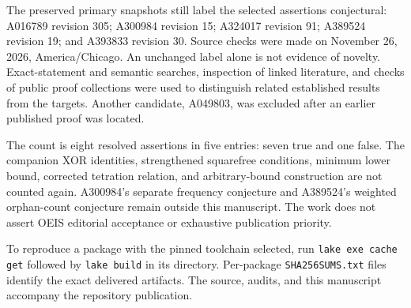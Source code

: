 \documentclass[11pt]{article}
\begin{document}
The preserved primary snapshots still label the selected assertions
conjectural: A016789 revision 305; A300984 revision 15; A324017 revision
91; A389524 revision 19; and A393833 revision 30. Source checks were made
on November 26, 2026, America/Chicago. An unchanged label alone is not
evidence of novelty. Exact-statement and semantic searches, inspection
of linked literature, and checks of public proof collections were used
to distinguish related established results from the targets. Another
candidate, A049803, was excluded after an earlier published proof was
located.

The count is eight resolved assertions in five entries: seven true and
one false. The companion XOR identities, strengthened squarefree
conditions, minimum lower bound, corrected tetration relation, and
arbitrary-bound construction are not counted again. A300984's separate
frequency conjecture and A389524's weighted orphan-count conjecture
remain outside this manuscript. The work does not assert OEIS editorial
acceptance or exhaustive publication priority.

To reproduce a package with the pinned toolchain selected, run
\texttt{lake exe cache get} followed by \texttt{lake build} in its
directory. Per-package \texttt{SHA256SUMS.txt} files identify the exact
delivered artifacts. The source, audits, and this manuscript accompany
the repository publication.
\end{document}
